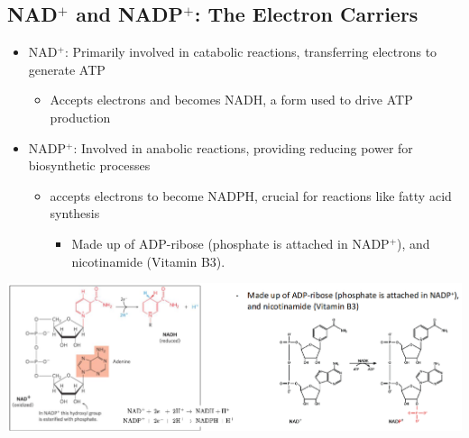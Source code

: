 \documentclass[10pt]{article}
\begin{document}
\subsection*{NAD$^+$ and NADP$^+$: The Electron Carriers}
\begin{itemize}
    \item NAD$^+$: Primarily involved in catabolic reactions, transferring electrons to generate ATP
    \begin{itemize}
        \item Accepts electrons and becomes NADH, a form used to drive ATP production
    \end{itemize}
    \item NADP$^+$: Involved in anabolic reactions, providing reducing power for biosynthetic processes
    \begin{itemize}
        \item accepts electrons to become NADPH, crucial for reactions like fatty acid synthesis
        \begin{itemize}
            \item Made up of ADP-ribose (phosphate is attached in NADP$^+$), and nicotinamide (Vitamin B3).
        \end{itemize}
    \end{itemize}  
\end{itemize}
\begin{center} 
	\includegraphics*[width=\textwidth]{L2_10.png}
\end{center}
\end{document}
